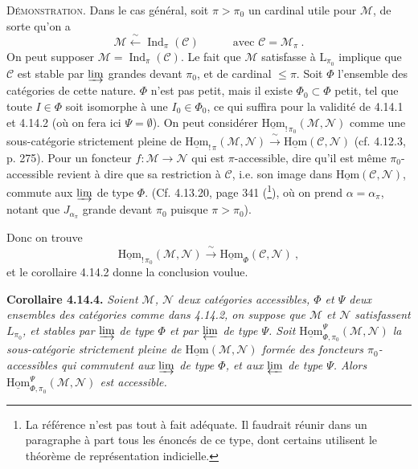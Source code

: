 \documentclass[11pt]{article}
\newcommand{\printedpage}[1]{\marginpar{\footnotesize p.~#1}}
\newcommand{\msp}[1]{\marginpar{\footnotesize [#1]}}
\DeclareMathOperator{\Ind}{Ind}
\newcommand{\uHom}{\underline{\mathrm{Hom}}}
\begin{document}
\noindent\textsc{Démonstration}. Dans le cas général, soit $\pi>\pi_0$ un cardinal utile pour $\mathcal{M}$, de sorte qu'on a
\[
\mathcal{M} \xleftarrow{\ \sim\ } \Ind_\pi(\mathcal{C}) \qquad\quad \text{avec } \mathcal{C}=\mathcal{M}_\pi\ .
\]
On peut supposer $\mathcal{M}=\Ind_\pi(\mathcal{C})$. Le fait que $\mathcal{M}$ satisfasse à $\mathrm{L}_{\pi_0}$ implique que $\mathcal{C}$ est stable par $\varinjlim$ grandes devant $\pi_0$, et de cardinal $\leqslant\pi$. Soit $\Phi$ l'ensemble des catégories de cette nature. $\Phi$ n'est pas petit, mais il existe $\Phi_0\subset\Phi$ petit, tel que toute $I\in\Phi$ soit isomorphe à une $I_0\in\Phi_0$, ce qui suffira pour la validité de 4.14.1 et 4.14.2 (où on fera ici $\Psi=\emptyset$). On peut considérer $\uHom_{!\,\pi_0}(\mathcal{M},\mathcal{N})$ comme une sous-catégorie strictement pleine de $\uHom_{!\,\pi}(\mathcal{M},\mathcal{N})\xrightarrow{\ \sim\ }\uHom(\mathcal{C},\mathcal{N})$ (cf. 4.12.3, p. 275). Pour un foncteur $f:\mathcal{M}\longrightarrow\mathcal{N}$ qui est $\pi$-accessible, dire qu'il est même $\pi_0$-accessible revient à dire que sa restriction à $\mathcal{C}$, i.e. son image dans $\uHom(\mathcal{C},\mathcal{N})$, commute aux $\varinjlim$ de type $\Phi$. (Cf. 4.13.20, page 341 (\footnote[164]{La référence n'est pas tout à fait adéquate. Il faudrait réunir dans un paragraphe à part tous les énoncés de ce type, dont certains utilisent le théorème de représentation indicielle.}), où on prend $\alpha=\alpha_\pi$, notant que $J_{\alpha_\pi}$ grande devant $\pi_0$ puisque $\pi>\pi_0$).

\msp{page 374}

Donc on trouve
\[
\uHom_{!\,\pi_0}(\mathcal{M},\mathcal{N}) \xrightarrow{\ \sim\ } \uHom_{\Phi}(\mathcal{C},\mathcal{N})\ ,
\]
\printedpage{142}
et le corollaire 4.14.2 donne la conclusion voulue.

\noindent\textbf{Corollaire 4.14.4.} {\itshape Soient $\mathcal{M}$, $\mathcal{N}$ deux catégories accessibles, $\Phi$ et $\Psi$ deux ensembles des catégories comme dans 4.14.2, on suppose que $\mathcal{M}$ et $\mathcal{N}$ satisfassent $L_{\pi_0}$, et stables par $\varinjlim$ de type $\Phi$ et par $\varprojlim$ de type $\Psi$. Soit $\uHom^{\Psi}_{\Phi,\pi_0}(\mathcal{M},\mathcal{N})$ la sous-catégorie strictement pleine de $\uHom(\mathcal{M},\mathcal{N})$ formée des foncteurs $\pi_0$-accessibles qui commutent aux $\varinjlim$ de type $\Phi$, et aux $\varprojlim$ de type $\Psi$. Alors $\uHom^{\Psi}_{\Phi,\pi_0}(\mathcal{M},\mathcal{N})$ est accessible.}
\end{document}

